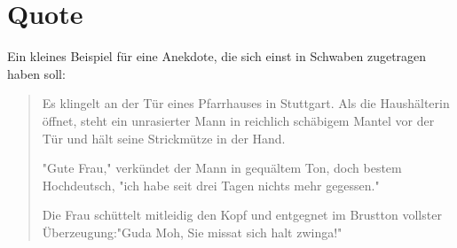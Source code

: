 \section{Quote}
	Ein kleines Beispiel für eine Anekdote, die sich einst in Schwaben zugetragen haben soll:
\begin{quote}
	Es klingelt an der Tür eines Pfarrhauses in Stuttgart. Als die Haushälterin öffnet, steht ein unrasierter Mann in reichlich schäbigem Mantel vor der Tür und hält seine Strickmütze in der Hand.
	
	"Gute Frau," verkündet der Mann in gequältem Ton, doch bestem Hochdeutsch, "ich habe seit drei Tagen nichts mehr gegessen."
	
	Die Frau schüttelt mitleidig den Kopf und entgegnet im Brustton vollster Überzeugung:"Guda Moh, Sie missat sich halt zwinga!"
\end{quote}


